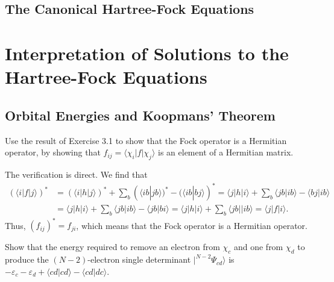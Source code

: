 \documentclass[a4paper]{book}
\newcounter{exercise}[chapter]
\newcounter{solution}[chapter]
\begin{document}
	\subsection{The Canonical Hartree-Fock Equations}
	
	\section{Interpretation of Solutions to the Hartree-Fock Equations}
	
	\subsection{Orbital Energies and Koopmans' Theorem}
	
	\begin{exercise}
	Use the result of Exercise 3.1 to show that the Fock operator is a Hermitian operator, by showing that $f_{ij}=\langle \chi_i | f | \chi_j \rangle$ is an element of a Hermitian matrix.
	\end{exercise}
	
	\begin{solution}
	
	The verification is direct. We find that
	\begin{align*}
		( \langle i | f | j \rangle )^* &= ( \langle i | h | j \rangle )^* + \sum_b ( \langle ib | jb \rangle )^* - ( \langle ib | bj \rangle )^* = \langle j | h | i \rangle + \sum_b \langle jb | ib \rangle - \langle bj | ib \rangle \\
		& = \langle j | h | i \rangle + \sum_b \langle jb | ib \rangle - \langle jb | bi \rangle = \langle j | h | i \rangle + \sum_b \langle jb || ib \rangle = \langle j | f | i \rangle .
	\end{align*}
	Thus, $(f_{ij})^* = f_{ji}$, which means that the Fock operator is a Hermitian operator.

	\end{solution}
	
	\begin{exercise}
	Show that the energy required to remove an electron from $\chi_c$ and one from $\chi_d$ to produce the $(N-2)$-electron single determinant $|^{N-2}\Psi_{cd}\rangle$ is $-\varepsilon_c - \varepsilon_d + \langle cd | cd \rangle - \langle cd | dc \rangle$.
	\end{exercise}
	
\end{document}
